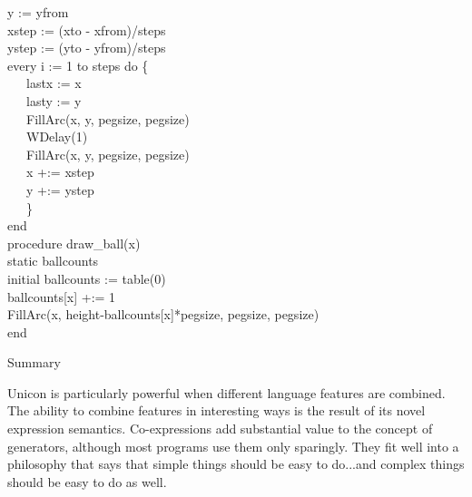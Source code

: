 {\>   y := yfrom \\
\>   xstep := (xto - xfrom)/steps \\
\>   ystep := (yto - yfrom)/steps \\
\>   every i := 1 to steps do \{ \\
\>   \ \ \ lastx := x \\
\>   \ \ \ lasty := y \\
\>   \ \ \ FillArc(x, y, pegsize, pegsize) \\
\>   \ \ \ WDelay(1) \\
\>   \ \ \ FillArc(x, y, pegsize, pegsize) \\
\>   \ \ \ x +:= xstep \\
\>   \ \ \ y +:= ystep \\
\>   \ \ \ \} \\
end
\ \\
procedure draw\_ball(x) \\
static ballcounts \\
initial ballcounts := table(0) \\
\>   ballcounts[x] +:= 1 \\
\>   FillArc(x, height-ballcounts[x]*pegsize, pegsize, pegsize) \\
end
}

{\sffamily
Summary}

Unicon is particularly powerful when different language features are
combined. The ability to combine features in interesting ways is the
result of its novel expression semantics. Co-expressions add
substantial value to the concept of generators,
although most programs use them only sparingly. They fit well into a
philosophy that says that simple things should be easy to do...and
complex things should be easy to do as well.

